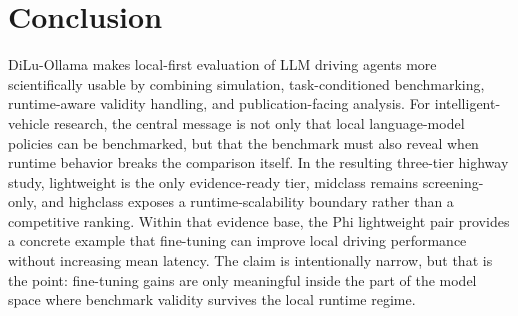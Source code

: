 \section{Conclusion}

DiLu-Ollama makes local-first evaluation of LLM driving agents more scientifically usable by combining simulation, task-conditioned benchmarking, runtime-aware validity handling, and publication-facing analysis. For intelligent-vehicle research, the central message is not only that local language-model policies can be benchmarked, but that the benchmark must also reveal when runtime behavior breaks the comparison itself. In the resulting three-tier highway study, lightweight is the only evidence-ready tier, midclass remains screening-only, and highclass exposes a runtime-scalability boundary rather than a competitive ranking. Within that evidence base, the Phi lightweight pair provides a concrete example that fine-tuning can improve local driving performance without increasing mean latency. The claim is intentionally narrow, but that is the point: fine-tuning gains are only meaningful inside the part of the model space where benchmark validity survives the local runtime regime.
